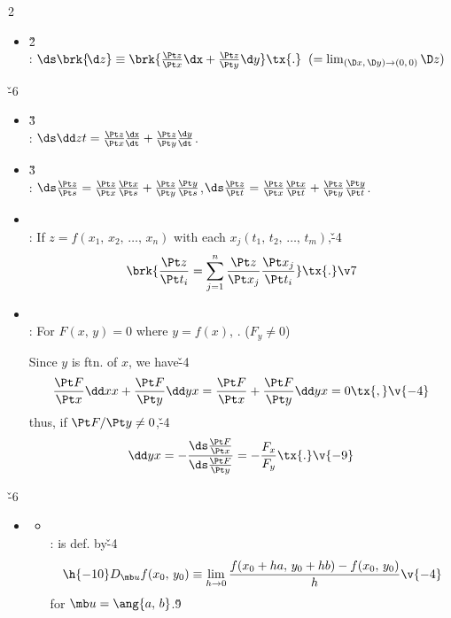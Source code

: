 \documentclass[dvipdfmx,a4paper,titlepage,9pt]{jsarticle}
\begin{document}
\begin{multicols*}{2}
\begin{itemize}[label={-}]
\item{}\v2\\
: $\ds\brk{\!\d z}\equiv\brk{\frac{\Pt z}{\Pt x}\dx+\frac{\Pt z}{\Pt y}\d y}\tx{.}\;\;(=\lim_{(\D x,\,\D y)\to(0,\,0)}\D z)$\\
\end{itemize}

\v{-6}
\begin{itemize}[label={-}]
\item{}\v3\\
: $\ds\dd zt=\frac{\Pt z}{\Pt x}\frac{\!\dx}{\!\dt}+\frac{\Pt z}{\Pt y}\frac{\!\d y}{\!\dt}$.\\

\item{}\v3\\
: $\ds\frac{\Pt z}{\Pt s}=\frac{\Pt z}{\Pt x}\frac{\Pt x}{\Pt s}+\frac{\Pt z}{\Pt y}\frac{\Pt y}{\Pt s}$,\quad$\ds\frac{\Pt z}{\Pt t}=\frac{\Pt z}{\Pt x}\frac{\Pt x}{\Pt t}+\frac{\Pt z}{\Pt y}\frac{\Pt y}{\Pt t}$.\\

\item{}\\
: If $z=f(x_1,\,x_2,\,\ldots,\,x_n)$ with each $x_j(t_1,\,t_2,\,\ldots,\,t_m)$,\v{-4}
$$\brk{\frac{\Pt z}{\Pt t_i}=\sum_{j=1}^n\frac{\Pt z}{\Pt x_j}\frac{\Pt x_j}{\Pt t_i}}\tx{.}\v7$$

\item{}\\
: For $F(x,\,y)=0$ where $y=f(x)$, \;. ($F_y\neq0$)

\begin{Pfbox}
Since $y$ is ftn. of $x$, we have\v{-4}
$$\frac{\Pt F}{\Pt x}\dd xx+\frac{\Pt F}{\Pt y}\dd yx=\frac{\Pt F}{\Pt x}+\frac{\Pt F}{\Pt y}\dd yx=0\tx{,}\v{-4}$$
thus, if $\Pt F/\Pt y\neq0$,\v{-4}
$$\dd yx=-\frac{\ds\frac{\Pt F}{\Pt x}}{\ds\frac{\Pt F}{\Pt y}}=-\frac{F_x}{F_y}\tx{.}\v{-9}$$
\end{Pfbox}
\end{itemize}

\;

\v{-6}
\begin{itemize}[label={-}]
\item{}
\begin{itemize}[label=\Cdot]
\setlength{\leftskip}{-10pt}
\item{}\\
:  is def. by\v{-4}
$$\h{-10}D_{\mb u}f(x_0,\,y_0)\equiv\lim_{h\to0}\frac{f(x_0+ha,\,y_0+hb)-f(x_0,\,y_0)}{h}\v{-4}$$
\;\;for $\mb u=\ang{a,\,b}$.\v9


\end{itemize}
\end{itemize}
\end{multicols*}
\end{document}
